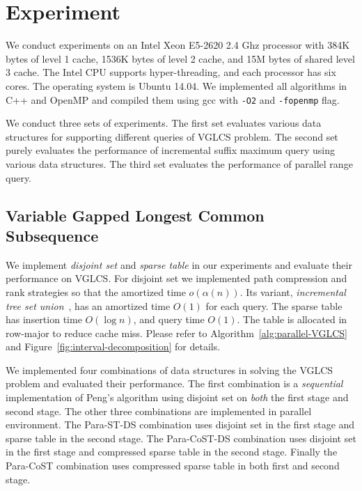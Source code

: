\section{Experiment} \label{sec:Experiment}

We conduct experiments on an Intel Xeon E5-2620 2.4 Ghz processor with
384K bytes of level 1 cache, 1536K bytes of level 2 cache, and 15M
bytes of shared level 3 cache.  The Intel CPU supports
hyper-threading, and each processor has six cores.  The operating
system is Ubuntu 14.04.  We implemented all algorithms in C++ and
OpenMP and compiled them using gcc with {\tt -O2} and {\tt -fopenmp}
flag.

We conduct three sets of experiments.  The first set evaluates various
data structures for supporting different queries of VGLCS problem.
The second set purely evaluates the performance of incremental suffix
maximum query using various data structures.  The third set evaluates
the performance of parallel range query.

\subsection{Variable Gapped Longest Common Subsequence}

We implement {\em disjoint set} and {\em sparse table} in our
experiments and evaluate their performance on VGLCS.  For disjoint set
we implemented path compression and rank strategies so that the
amortized time $o(\alpha(n))$.  Its variant, {\em incremental tree set
  union}~\cite{Gabow1983ALA}, has an amortized time $O(1)$ for each
query.  The sparse table has insertion time $O(\log n)$, and query
time $O(1)$.  The table is allocated in row-major to reduce cache
miss.  Please refer to Algorithm~\ref{alg:parallel-VGLCS} and
Figure~\ref{fig:interval-decomposition} for details.

We implemented four combinations of data structures in solving the VGLCS
problem and evaluated their performance.  The first combination is a
{\em sequential} implementation of Peng's algorithm using disjoint set
on {\em both} the first stage and second stage.  The other three
combinations are implemented in parallel environment.  The {\sc
Para-ST-DS} combination uses disjoint set in the first stage and sparse
table in the second stage.  The {\sc Para-CoST-DS} combination uses
disjoint set in the first stage and compressed sparse table in the
second stage. Finally the {\sc Para-CoST} combination uses compressed
sparse table in both first and second stage.

